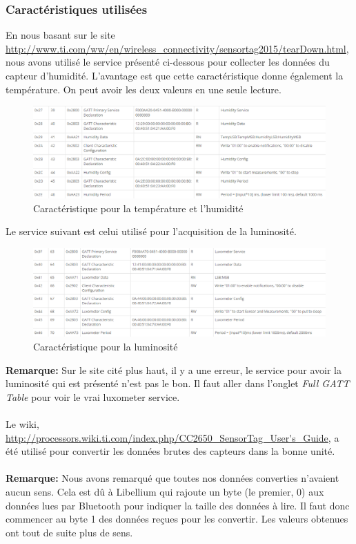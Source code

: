 \subsubsection{Caractéristiques utilisées}
En nous basant sur le site \url{http://www.ti.com/ww/en/wireless_connectivity/sensortag2015/tearDown.html}, nous avons utilisé le service présenté ci-dessous pour collecter les données du capteur d'humidité. L'avantage est que cette caractéristique donne également la température. On peut avoir les deux valeurs en une seule lecture. 
\begin{figure}[H]
	\begin{center}
		\includegraphics[width=17cm]{img/carhum.png}
		\caption{Caractéristique pour la température et l'humidité}
		\label{humidity}
	\end{center}
\end{figure}
Le service suivant est celui utilisé pour l'acquisition de la luminosité.
\begin{figure}[H]
	\begin{center}
		\includegraphics[width=17cm]{img/carlum.png}
		\caption{Caractéristique pour la luminosité}
		\label{luminosity}
	\end{center}
\end{figure}
\textbf{Remarque: }Sur le site cité plus haut, il y a une erreur, le service pour avoir la luminosité qui est présenté n'est pas le bon. Il faut aller dans l'onglet \textit{Full GATT Table} pour voir le vrai luxometer service.\\\\
Le wiki, \url{http://processors.wiki.ti.com/index.php/CC2650_SensorTag_User's_Guide}, a été utilisé pour convertir les données brutes des capteurs dans la bonne unité.\\\\
\textbf{Remarque: }Nous avons remarqué que toutes nos données converties n'avaient aucun sens. Cela est dû à Libellium qui rajoute un byte (le premier, 0) aux données lues par Bluetooth pour indiquer la taille des données à lire. Il faut donc commencer au byte 1 des données reçues pour les convertir. Les valeurs obtenues ont tout de suite plus de sens.
